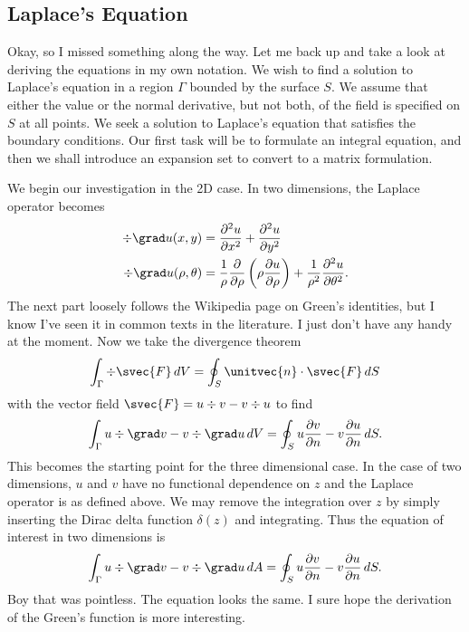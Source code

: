 \documentclass[aps,prl,reprint]{revtex4-1}
\begin{document}
\subsection{Laplace's Equation}
Okay, so I missed something along the way.  Let me back up and take a
look at deriving the equations in my own notation.  We wish to find a
solution to Laplace's equation in a region \(\Gamma\) bounded by the
surface \(S\).  We assume that either the value or the normal
derivative, but not both, of the field is specified on \(S\) at all
points.  We seek a solution to Laplace's equation that satisfies the
boundary conditions.  Our first task will be to formulate an integral
equation, and then we shall introduce an expansion set to convert to a
matrix formulation.

We begin our investigation in the 2D case.  In two dimensions, the
Laplace operator becomes
\begin{align*}
    \div\grad u(x,y) &= \frac{\partial^2 u}{\partial x^2}
    +\frac{\partial^2 u}{\partial y^2} \\
    \div\grad u(\rho,\theta) &= \frac{1}{\rho}
    \frac{\partial}{\partial\rho} 
    \left( \rho\frac{\partial u}{\partial\rho} \right)
    +\frac{1}{\rho^2}\frac{\partial^2 u}{\partial\theta^2}.
\end{align*}
The next part loosely follows the Wikipedia page on Green's identities,
but I know I've seen it in common texts in the literature.  I just don't
have any handy at the moment.  Now we take the divergence theorem
\begin{equation*}
    \int_\Gamma \div\svec{F}\,dV = \oint_S \unitvec{n}\cdot\svec{F}\,dS
\end{equation*}
with the vector field \(\svec{F} = u\div v -v\div u\) to find
\begin{equation*}
    \int_\Gamma u\div\grad v -v\div\grad u \, dV =
    \oint_S
    u\frac{\partial v}{\partial n} -v\frac{\partial u}{\partial n}
    \,dS.
\end{equation*}
This becomes the starting point for the three dimensional case.  In the
case of two dimensions, \(u\) and \(v\) have no functional dependence on
\(z\) and the Laplace operator is as defined above.  We may remove the
integration over \(z\) by simply inserting the Dirac delta function
\(\delta(z)\) and integrating.  Thus the equation of interest in two
dimensions is 
\begin{equation*}
    \int_\Gamma u\div\grad v -v\div\grad u \, dA =
    \oint_S
    u\frac{\partial v}{\partial n} -v\frac{\partial u}{\partial n}
    \,dS.
\end{equation*}
Boy that was pointless.  The equation looks the same.  I sure hope the
derivation of the Green's function is more interesting.
\end{document}
